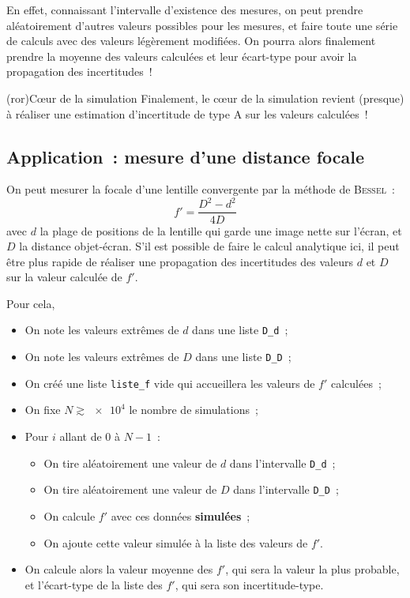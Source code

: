 \documentclass[a4paper, 12pt, garamond]{book}
\begin{document}
En effet, connaissant l'intervalle d'existence des mesures, on peut prendre
aléatoirement d'autres valeurs possibles pour les mesures, et faire toute une
série de calculs avec des valeurs légèrement modifiées. On pourra alors
finalement prendre la moyenne des valeurs calculées et leur écart-type pour
avoir la propagation des incertitudes~!

\begin{tcb}(ror){Cœur de la simulation}
  Finalement, le cœur de la simulation revient (presque) à réaliser une estimation
  d'incertitude de type A sur les valeurs calculées~!
\end{tcb}

\subsection{Application~: mesure d'une distance focale}
On peut mesurer la focale d'une lentille convergente par la méthode de
\textsc{Bessel}~:
\[
  \boxed{f' = \frac{D^{2}-d^{2}}{4D}}
\]
avec $d$ la plage de positions de la lentille qui garde une image nette sur
l'écran, et $D$ la distance objet-écran. S'il est possible de faire le calcul
analytique ici, il peut être plus rapide de réaliser une propagation des
incertitudes des valeurs $d$ et $D$ sur la valeur calculée de $f'$.

Pour cela,
\begin{itemize}[label=$\diamond$, leftmargin=10pt]
  \item On note les valeurs extrêmes de $d$ dans une liste \texttt{D\_d}~;
  \item On note les valeurs extrêmes de $D$ dans une liste \texttt{D\_D}~;
  \item On créé une liste \texttt{liste\_f} vide qui accueillera les valeurs de
    $f'$ calculées~;
  \item On fixe $N \gtrsim \num{e4}$ le nombre de simulations~;
  \item Pour $i$ allant de 0 à $N-1$~:
    \begin{itemize}[label=$\triangleright$, leftmargin=10pt]
      \item On tire aléatoirement une valeur de $d$ dans l'intervalle
        \texttt{D\_d}~;
      \item On tire aléatoirement une valeur de $D$ dans l'intervalle
        \texttt{D\_D}~;
      \item On calcule $f'$ avec ces données \textbf{simulées}~;
      \item On ajoute cette valeur simulée à la liste des valeurs de $f'$.
    \end{itemize}
  \item On calcule alors la valeur moyenne des $f'$, qui sera la valeur la plus
    probable, et l'écart-type de la liste des $f'$, qui sera son
    incertitude-type.
\end{itemize}
\end{document}
